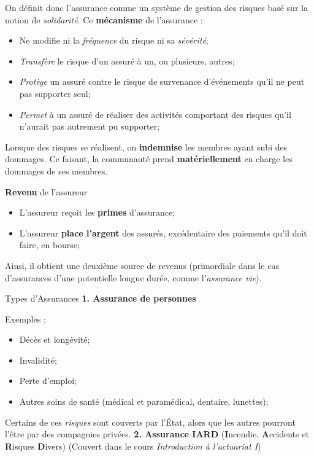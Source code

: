 \documentclass[10pt, french]{article}
\begin{document}
\begin{multicols*}{3}
\begin{definitionNOHFILL}[L'assurance]
On définit donc l'assurance comme un système de gestion des risques basé sur la notion de \textit{solidarité}. Ce \textbf{mécanisme} de l'assurance :
\begin{itemize}
	\item	Ne modifie ni la \textit{fréquence} du risque ni sa \textit{sévérité};
	\item	\textit{Transfère} le risque d'un assuré à un, ou plusieurs, autres;
	\item	\textit{Protège} un assuré contre le risque de survenance d'événements qu'il ne peut pas supporter seul;
	\item	\textit{Permet} à un assuré de réaliser des activités comportant des risques qu'il n'aurait pas autrement pu supporter;
\end{itemize}

Lorsque des risques se réalisent, on \textbf{indemnise} les membres ayant subi des dommages. Ce faisant, la communauté prend \textbf{matériellement} en charge les dommages de ses membres.

\end{definitionNOHFILL}

\begin{algo}{\textbf{Revenu} de l'assureur}
\begin{itemize}
	\item	L'assureur reçoit les \textbf{primes} d'assurance;
	\item	L'assureur \textbf{place l'argent} des assurés, excédentaire des paiements qu'il doit faire, en bourse;
\end{itemize}
Ainsi, il obtient une deuxième source de revenus (primordiale dans le cas d'assurances d'une potentielle longue durée, comme l'\textit{assurance vie}).
\end{algo}


\begin{conceptgen}{Types d'Assurances}
\textbf{1. Assurance de personnes}  

Exemples : 
\begin{itemize}[leftmargin = *]
	\item	Décès et longévité;
	\item	Invalidité;
	\item	Perte d'emploi;
	\item	Autres soins de santé (médical et paramédical, dentaire, lunettes);
\end{itemize}  

Certains de ces \textit{risques} sont couverts par l'État, alors que les autres pourront l'être par des compagnies privées.   
\tcbline
\textbf{2. Assurance IARD} (\textbf{I}ncendie, \textbf{A}ccidents et \textbf{R}isques \textbf{D}ivers)  \textcolor{amaranth}{(Couvert dans le cours \textit{Introduction à l'actuariat I})}  


\end{conceptgen}
\end{multicols*}
\end{document}
